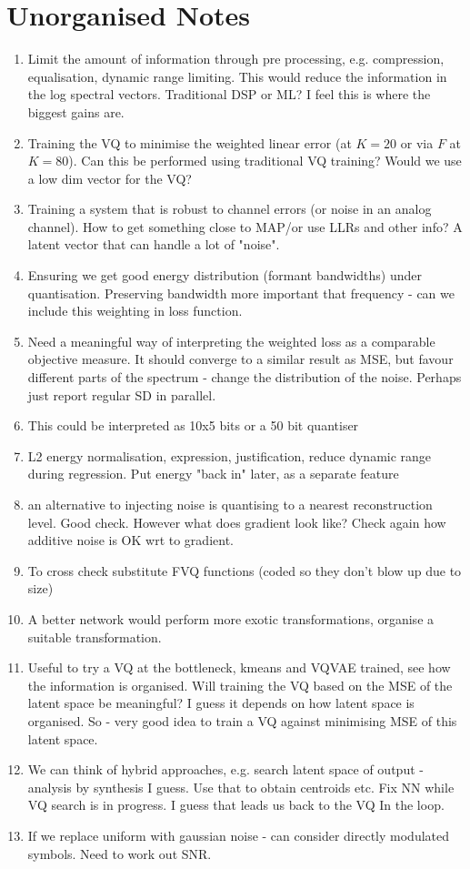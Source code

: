 \documentclass{article}
\begin{document}
\section {Unorganised Notes}

\begin{enumerate}
\item Limit the amount of information through pre processing, e.g. compression, equalisation, dynamic range limiting.  This would reduce the information in the log spectral vectors.  Traditional DSP or ML? I feel this is where the biggest gains are.
\item Training the VQ to minimise the weighted linear error (at $K=20$ or via $F$ at $K=80$).  Can this be performed using traditional VQ training?  Would we use a low dim vector for the VQ?
\item Training a system that is robust to channel errors (or noise in an analog channel). How to get something close to MAP/or use LLRs and other info?  A latent vector that can handle a lot of "noise".
\item Ensuring we get good energy distribution (formant bandwidths) under quantisation.  Preserving bandwidth more important that frequency - can we include this weighting in loss function.
\item Need a meaningful way of interpreting the weighted loss as a comparable objective measure.  It should converge to a similar result as MSE, but favour different parts of the spectrum - change the distribution of the noise. Perhaps just report regular SD in parallel.
\item This could be interpreted as 10x5 bits or a 50 bit quantiser
\item L2 energy normalisation, expression, justification, reduce dynamic range during regression. Put energy "back in" later, as a separate feature
\item an alternative to injecting noise is quantising to a nearest reconstruction level.  Good check.  However what does gradient look like?  Check again how additive noise is OK wrt to gradient. 
\item To cross check substitute FVQ functions (coded so they don't blow up due to size)
\item A better network would perform more exotic transformations, organise a suitable transformation.
\item Useful to try a VQ at the bottleneck, kmeans and VQVAE trained, see how the information is organised.  Will training the VQ based on the MSE of the latent space be meaningful?  I guess it depends on how latent space is organised.  So - very good idea to train a VQ against minimising MSE of this latent space.
\item We can think of hybrid approaches, e.g. search latent space of output - analysis by synthesis I guess.  Use that to obtain centroids etc.  Fix NN while VQ search is in progress.  I guess that leads us back to the VQ In the loop.
\item If we replace uniform with gaussian noise - can consider directly modulated symbols.  Need to work out SNR.
\end{enumerate}



\end{document}
